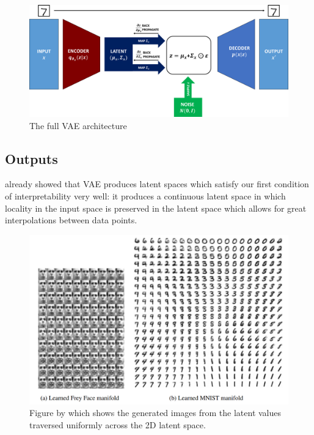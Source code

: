             \begin{figure}[H]
                \centering
                \includegraphics[width=1\textwidth]{imgs/vae_arch2.png}
                \caption{The full VAE architecture}
                \label{fig:vae_arch2}
            \end{figure}
            
        \subsection{Outputs}
            \cite{kingma2013auto} already showed that VAE produces latent spaces which satisfy our first condition of interpretability very well: it produces a continuous latent space in which locality in the input space is preserved in the latent space which allows for great interpolations between data points.
            
            \begin{figure}[H]
                \centering
                \includegraphics[width=1\textwidth]{imgs/vae_freyface_mnist.png}
                \caption{Figure by \cite{kingma2013auto} which shows the generated images from the latent values traversed uniformly across the 2D latent space.}
                \label{fig:vae_freyface_mnist}
            \end{figure}

